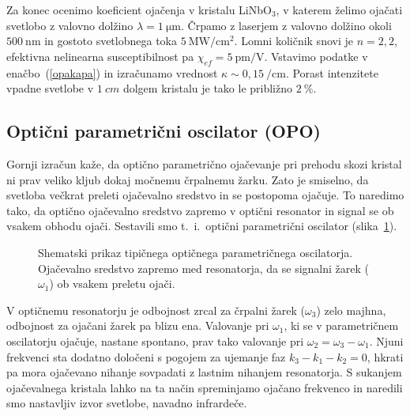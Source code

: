 Za konec ocenimo koeficient ojačenja v kristalu 
LiNbO$_{3}$, v katerem želimo
ojačati svetlobo z valovno dolžino $\lambda = 1~\si{\micro\metre}$. Črpamo z laserjem z 
valovno dolžino okoli $500~\si{\nano\metre}$ in gostoto svetlobnega 
toka $5~\si{\mega\watt}/\si{\centi\metre}^{2}$. Lomni količnik snovi je 
$n = 2,2$, efektivna nelinearna susceptibilnost pa  $\chi_{ef} = 5~\si{\pico\metre}/\si{\volt}$. 
Vstavimo podatke v enačbo~(\ref{opakapa}) in izračunamo vrednost 
$\kappa \sim 0,15~/\si{\centi\metre}$. Porast intenzitete vpadne svetlobe v $1~\si{cm}$ 
dolgem kristalu je tako le približno $2~\%$. 

\subsection*{Optični parametrični oscilator (OPO)}
Gornji izračun kaže, da optično parametrično ojačevanje pri prehodu skozi kristal ni prav veliko
kljub dokaj močnemu črpalnemu žarku. Zato je smiselno, da svetloba večkrat preleti
ojačevalno sredstvo in se postopoma ojačuje. To naredimo tako, 
da optično ojačevalno sredstvo zapremo v optični 
resonator
in signal se ob vsakem obhodu ojači. Sestavili smo t.\ i.\ optični parametrični oscilator
(slika~\ref{fig:opo}). 
\begin{figure}[h]
\centering
\def\svgwidth{80truemm} 

\caption{Shematski prikaz tipičnega optičnega parametričnega oscilatorja. Ojačevalno sredstvo
zapremo med resonatorja, da se signalni žarek ($\omega_1$) ob vsakem preletu ojači.}
\label{fig:opo}
\end{figure}

V optičnemu resonatorju je odbojnost zrcal za črpalni žarek ($\omega_3$) zelo majhna, 
odbojnost za ojačani žarek pa blizu ena. Valovanje pri $\omega_1$,
ki se v parametričnem oscilatorju ojačuje, nastane spontano, prav tako valovanje pri 
$\omega_2 = \omega_3 -\omega_1$. Njuni frekvenci sta dodatno določeni s pogojem za 
ujemanje faz $ k_3 - k_1 - k_2 = 0$, 
hkrati pa mora ojačevano nihanje sovpadati z lastnim nihanjem resonatorja. 
S sukanjem ojačevalnega kristala lahko na ta način spreminjamo
ojačano frekvenco in naredili smo nastavljiv izvor svetlobe, navadno infrardeče.

